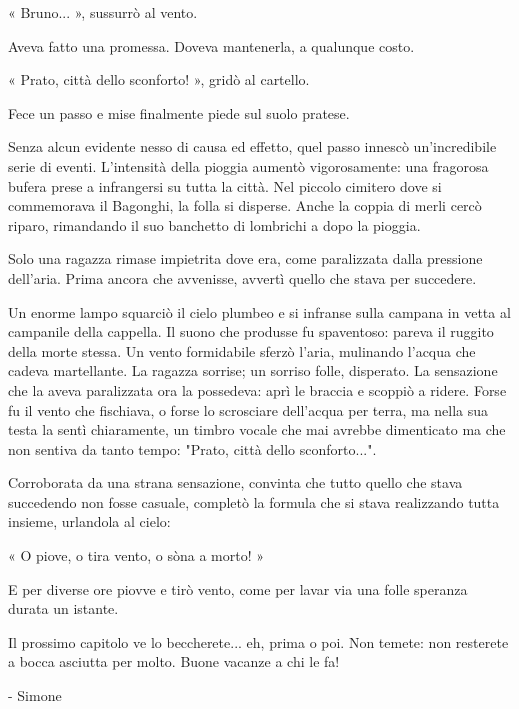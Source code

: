 « Bruno... », sussurrò al vento.

Aveva fatto una promessa. Doveva mantenerla, a qualunque costo.

« Prato, città dello sconforto! », gridò al cartello.

Fece un passo e mise finalmente piede sul suolo pratese.

Senza alcun evidente nesso di causa ed effetto, quel passo innescò un'incredibile serie di eventi. L'intensità della pioggia aumentò vigorosamente: una fragorosa bufera prese a infrangersi su tutta la città. Nel piccolo cimitero dove si commemorava il Bagonghi, la folla si disperse. Anche la coppia di merli cercò riparo, rimandando il suo banchetto di lombrichi a dopo la pioggia. 

Solo una ragazza rimase impietrita dove era, come paralizzata dalla pressione dell'aria. Prima ancora che avvenisse, avvertì quello che stava per succedere.

Un enorme lampo squarciò il cielo plumbeo e si infranse sulla campana in vetta al campanile della cappella. Il suono che produsse fu spaventoso: pareva il ruggito della morte stessa. Un vento formidabile sferzò l'aria, mulinando l'acqua che cadeva martellante. La ragazza sorrise; un sorriso folle, disperato. La sensazione che la aveva paralizzata ora la possedeva: aprì le braccia e scoppiò a ridere. Forse fu il vento che fischiava, o forse lo scrosciare dell'acqua per terra, ma nella sua testa la sentì chiaramente, un timbro vocale che mai avrebbe dimenticato ma che non sentiva da tanto tempo: "Prato, città dello sconforto...".

Corroborata da una strana sensazione, convinta che tutto quello che stava succedendo non fosse casuale, completò la formula che si stava realizzando tutta insieme, urlandola al cielo:

« O piove, o tira vento, o sòna a morto! »

E per diverse ore piovve e tirò vento, come per lavar via una folle speranza durata un istante.


Il prossimo capitolo ve lo beccherete... eh, prima o poi. Non temete: non resterete a bocca asciutta per molto. Buone vacanze a chi le fa!

- Simone



